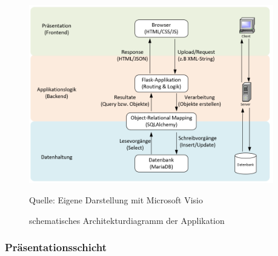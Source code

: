 \begin{figure}[H]
    \centering
    \includegraphics[width=0.95\textwidth]{Grafiken/Architekturdiagramm}
    \caption{schematisches Architekturdiagramm der Applikation}
    \label{fig:arch_minimal}
    {Quelle: Eigene Darstellung mit Microsoft Visio}
\end{figure}

\subsubsection*{Präsentationsschicht}

